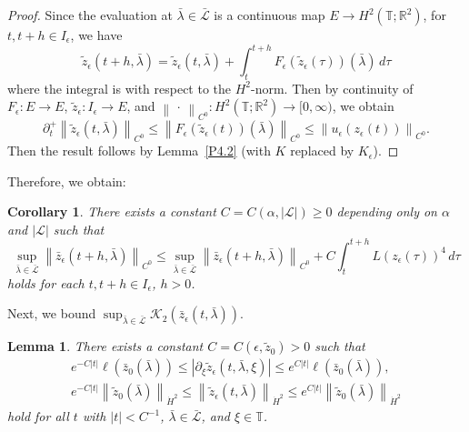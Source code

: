 \documentclass[reqno,centertags,12pt]{amsart}
\newtheorem{lemma}[theorem]{Lemma}
\newtheorem{corollary}[theorem]{Corollary}
\theoremstyle{definition}
\numberwithin{equation}{section}
\newcommand{\abs}[1]{\left\lvert#1\right\rvert}
\newcommand{\norm}[1]{\left\|#1\right\|}
\newcommand{\bbR}{{\mathbb{R}}}
\newcommand{\bbT}{{\mathbb{T}}}
\begin{document}
\begin{proof}
    Since the evaluation at $\bar{\lambda}\in\bar{\mathcal{L}}$ is a continuous
    map $E\to H^{2}(\bbT;\bbR^{2})$, for $t,t+h\in I_{\epsilon}$, we have
    \[
        \tilde{z}_{\epsilon}(t+h,\bar{\lambda})
        = \tilde{z}_{\epsilon}(t,\bar{\lambda})
        + \int_{t}^{t+h}F_{\epsilon}(\tilde{z}_{\epsilon}(\tau))(\bar{\lambda})\,d\tau
    \]
    where the integral is with respect to the $H^{2}$-norm.
    Then by continuity of $F_{\epsilon}\colon E\to E$,
    $\tilde{z}_{\epsilon}\colon I_{\epsilon}\to E$, and
    $\norm{\,\cdot\,}_{C^{0}}\colon H^{2}(\bbT;\bbR^{2})\to[0,\infty)$, we obtain
    \[
        \partial_{t}^{+}\norm{\tilde{z}_{\epsilon}(t,\bar{\lambda})}_{C^{0}}
        \leq \norm{F_{\epsilon}(\tilde{z}_{\epsilon}(t))(\bar{\lambda})}_{C^{0}}
        \leq \norm{u_{\epsilon}(z_{\epsilon}(t))}_{C^{0}}.
    \]
    Then the result follows by Lemma~\ref{P4.2}
    (with $K$ replaced by $K_{\epsilon}$).
\end{proof}

Therefore, we obtain:

\begin{corollary}\label{C6.5}
    There exists a constant $C=C(\alpha,\abs{\mathcal{L}})\geq 0$
    depending only on $\alpha$ and $\abs{\mathcal{L}}$ such that
    \[
        \sup_{\bar{\lambda}\in\bar{\mathcal{L}}}
        \norm{\bar{z}_{\epsilon}(t+h,\bar{\lambda})}_{C^{0}}
        \leq
        \sup_{\bar{\lambda}\in\bar{\mathcal{L}}}
        \norm{\bar{z}_{\epsilon}(t+h,\bar{\lambda})}_{C^{0}}
        + C\int_{t}^{t+h}L(z_{\epsilon}(\tau))^{4}\,d\tau
    \]
    holds for each $t,t+h\in I_{\epsilon}$, $h>0$.
\end{corollary}

Next, we bound $\sup_{\bar{\lambda}\in\bar{\mathcal{L}}}
\mathcal{K}_{2}\left(\bar{z}_{\epsilon}(t,\bar{\lambda})\right)$.

\begin{lemma}\label{L6.6}
    There exists a constant $C=C(\epsilon,\tilde{z}_{0})>0$ such that
    \begin{gather*}
        e^{-C\abs{t}}
        \ell(\bar{z}_{0}(\bar{\lambda}))
        \leq \abs{\partial_{\xi}\tilde{z}_{\epsilon}(t,\bar{\lambda},\xi)}
        \leq e^{C\abs{t}}
        \ell(\bar{z}_{0}(\bar{\lambda})), \\
        e^{-C\abs{t}}
        \norm{\tilde{z}_{0}(\bar{\lambda})}_{\dot{H}^{2}}
        \leq \norm{\tilde{z}_{\epsilon}(t,\bar{\lambda})}_{\dot{H}^{2}}
        \leq e^{C\abs{t}}
        \norm{\tilde{z}_{0}(\bar{\lambda})}_{\dot{H}^{2}}
    \end{gather*}
    hold for all $t$ with $\abs{t}<C^{-1}$,
    $\bar{\lambda}\in\bar{\mathcal{L}}$, and $\xi\in\bbT$.
\end{lemma}
\end{document}
